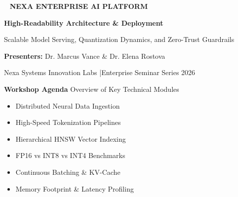 \documentclass[20pt,landscape,a4paper]{foils}
\newcommand{\SlideHeader}[2]{%
  \begin{tcolorbox}[headerbox]
    {\Huge\bfseries #1} \hfill {\large\textcolor{SlateBorder}{#2}}
  \end{tcolorbox}
  \vspace{6pt}
}
\begin{document}
\begin{tcolorbox}[enhanced, arc=8pt, boxrule=2pt, colback=NavyPrimary, colframe=TealAccent, boxsep=16pt, top=18pt, bottom=18pt]
  \centering
  \textcolor{AmberAccent}{\Huge \faRocket~ \textbf{NEXA ENTERPRISE AI PLATFORM}} \par
  \vspace{10pt}
  {\color{white}\Huge\bfseries High-Readability Architecture \& Deployment} \par
  \vspace{8pt}
  {\color{SlateBorder}\Large Scalable Model Serving, Quantization Dynamics, and Zero-Trust Guardrails} \par
  \vspace{18pt}
  \begin{tcolorbox}[enhanced, colback=white!10, colframe=white!30, arc=4pt, width=0.85\textwidth, halign=center]
    {\color{white}\large \textbf{Presenters:} Dr. Marcus Vance \& Dr. Elena Rostova} \par
    \vspace{4pt}
    {\color{SlateBorder}\small Nexa Systems Innovation Labs \quad|\quad Enterprise Seminar Series 2026}
  \end{tcolorbox}
\end{tcolorbox}
\pagebreak

\SlideHeader{Workshop Agenda}{Overview of Key Technical Modules}

\noindent
\begin{minipage}[t]{0.48\textwidth}
  \begin{tcolorbox}[accentbox, title={\textcolor{NavyPrimary}{\large \faCogs~ \textbf{Module 01: Core Architecture}}}, fonttitle=\bfseries]
    \begin{itemize}[leftmargin=16pt, label=\textcolor{TealAccent}{\small\faCheck}]
      \item Distributed Neural Data Ingestion
      \item High-Speed Tokenization Pipelines
      \item Hierarchical HNSW Vector Indexing
    \end{itemize}
  \end{tcolorbox}
\end{minipage}%
\hfill
\begin{minipage}[t]{0.48\textwidth}
  \begin{tcolorbox}[accentbox, title={\textcolor{NavyPrimary}{\large \faServer~ \textbf{Module 02: High-Throughput Serving}}}, fonttitle=\bfseries]
    \begin{itemize}[leftmargin=16pt, label=\textcolor{TealAccent}{\small\faCheck}]
      \item FP16 vs INT8 vs INT4 Benchmarks
      \item Continuous Batching \& KV-Cache
      \item Memory Footprint \& Latency Profiling
    \end{itemize}
  \end{tcolorbox}
\end{minipage}
\end{document}
